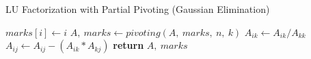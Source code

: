 \documentclass{article}
\begin{document}
  \begin{algorithm}
    \caption{LU Factorization with Partial Pivoting (Gaussian Elimination)}
    \begin{algorithmic}[1]
          \State $marks[i] \gets i$
        \EndFor
          \State $A,\ marks \gets pivoting(A,\ marks,\ n,\ k)$
            \State $A_{ik} \gets A_{ik} / A_{kk}$
              \State $A_{ij} \gets A_{ij} - (A_{ik} * A_{kj})$
            \EndFor
          \EndFor
        \EndFor
        \State \textbf{return} $A,\ marks$
      \EndProcedure
    \end{algorithmic}
  \end{algorithm}
\end{document}
